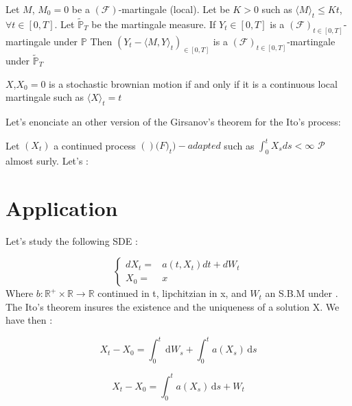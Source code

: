 \begin{prop}
\label{Girsanov theorem}
Let $M$, $M_{0}=0$ be a $(\mathcal{F})$-martingale (local).
\newline
Let be $K > 0$ such as $\langle M\rangle_{t}\leq Kt$,  $\forall t \in [0,T]$.
\newline
Let $\tilde{\mathbb{P}}_{T}$ be the martingale measure.
\newline
\newline
If $Y_t \in [0,T]$ is a $(\mathcal{F})_{t \in [0,T]}$-martingale under $\mathbb{P}$
\newline
Then $(Y_t-\langle M,Y\rangle_{t})_{\in [0,T]}$ is a $(\mathcal{F})_{t \in [0,T]}$-martingale under $\tilde{\mathbb{P}}_{T}$
\end{prop}



\begin{prop}
\label{Levy-theorem}
$X$,$X_{0}=0$ is a stochastic brownian motion if and only if it is a continuous local martingale such as $\langle X\rangle_{t}=t$
\end{prop}


Let's  enonciate an  other  version  of the  Girsanov's  theorem  for the  Ito's
process:
\begin{thm}
\label{Girs-thm-ito}
  Let $(X_t)$  a continued process $()\mathcal(F)_t)-adapted$  such as $\int^t_0
  X_sds < \infty $ $\mathcal{P}$ almost surly. Let's :
  
\end{thm}
\section{Application}
Let's study the following SDE :

\[
\begin{cases}
dX_{t}= & a(t,X_{t})dt+dW_{t}\\
X_{0}= & x
\end{cases}
\]
Where $b:\mathbb{R^+} \times \mathbb{R}  \rightarrow \mathbb{R}$ continued in t,
lipchitzian in x, and $W_t$ an S.B.M under .\\
The Ito's theorem insures  the existence and the uniqueness of  a solution X. We
have then :


\[
X_{t}-X_{0}=\int_0^t  \, \mathrm dW_s + \int_0^t a(X_{s}) \, \mathrm ds
\]

\begin{equation}
X_{t}-X_{0}=\int_0^t a(X_{s}) \, \mathrm ds + W_t
\label{exemple}
\end{equation}

